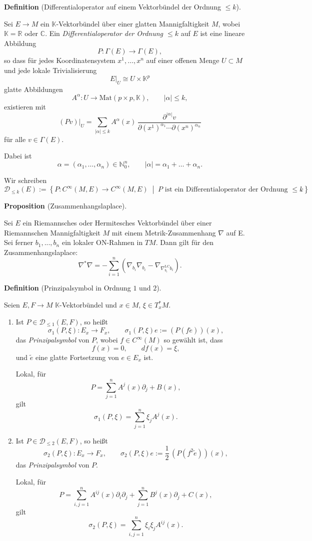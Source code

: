 \documentclass[10pt, letterpaper]{article}
\newcommand{\R}{\mathbb{R}}
\newcommand{\C}{\mathbb{C}}
\newcommand{\Mat}{\mathrm{Mat}}
\newcommand{\CustomHeading}[3]{%
  \par\medskip\noindent%
  \textbf{#1 #2} \textnormal{(#3)}.\enskip%
}
\newenvironment{DEF}[2]{\CustomHeading{Definition}{#1}{#2}}{}
\newenvironment{PROP}[2]{\CustomHeading{Proposition}{#1}{#2}}{}
\begin{document}
\begin{DEF}{}{Differentialoperator auf einem Vektorbündel der Ordnung $\le k$}
Sei $E \to M$ ein $\mathbb{K}$-Vektorbündel über einer glatten Mannigfaltigkeit $M$,
wobei $\mathbb{K}=\R$ oder $\C$.
Ein \emph{Differentialoperator der Ordnung $\le k$} auf $E$ ist eine lineare Abbildung
\[
P:\Gamma(E)\to \Gamma(E),
\]
so dass für jedes Koordinatensystem $x^1,\dots,x^n$ auf einer offenen Menge
$U\subset M$ und jede lokale Trivialisierung
\[
E|_U \cong U\times \mathbb{K}^p
\]
glatte Abbildungen
\[
A^\alpha:U\to \Mat(p\times p,\mathbb{K}),
\qquad |\alpha|\le k,
\]
existieren mit
\[
(Pv)|_U
=
\sum_{|\alpha|\le k}
A^\alpha(x)\,
\frac{\partial^{|\alpha|}v}{\partial (x^1)^{\alpha_1}\cdots \partial (x^n)^{\alpha_n}}
\]
für alle $v\in \Gamma(E)$.

Dabei ist
\[
\alpha=(\alpha_1,\dots,\alpha_n)\in \mathbb N_0^n,
\qquad
|\alpha|=\alpha_1+\dots+\alpha_n.
\]

Wir schreiben
\[
\mathscr D_{\le k}(E)
:=
\left\{
P:C^\infty(M,E)\to C^\infty(M,E)
\;\middle|\;
P \text{ ist ein Differentialoperator der Ordnung }\le k
\right\}.
\]
\end{DEF}


\begin{PROP}{\parencite[p.~110]{BaerSpin}}{Zusammenhangslaplace}
  Sei $E$ ein Riemannsches oder Hermitesches Vektorbündel über einer Riemannschen Mannigfaltigkeit $M$ mit einem Metrik-Zusammenhang $\nabla$ auf E. Sei ferner $b_1,...,b_n$ ein lokaler ON-Rahmen in $TM$. Dann gilt für den Zusammenhangslaplace:
    $$
    \nabla^* \nabla=-\sum_{i=1}^n\left(\nabla_{b_i} \nabla_{b_i}-\nabla_{\nabla_{b_i}^{\mathrm{LC}}b_i}\right) .
    $$
\end{PROP}

\begin{DEF}{}{Prinzipalsymbol in Ordnung \(1\) und \(2\)}
Seien \(E,F\to M\) \(\mathbb{K}\)-Vektorbündel und \(x\in M\), \(\xi\in T_x^*M\).

\begin{enumerate}
    \item Ist \(P\in \mathscr D_{\le 1}(E,F)\), so heißt
    \[
    \sigma_1(P,\xi):E_x\to F_x,
    \qquad
    \sigma_1(P,\xi)e:=(P(f\widetilde e))(x),
    \]
    das \emph{Prinzipalsymbol} von \(P\), wobei \(f\in C^\infty(M)\) so gewählt ist, dass
    \[
    f(x)=0,\qquad df(x)=\xi,
    \]
    und \(\widetilde e\) eine glatte Fortsetzung von \(e\in E_x\) ist.

    Lokal, für
    \[
    P=\sum_{j=1}^n A^j(x)\partial_j + B(x),
    \]
    gilt
    \[
    \sigma_1(P,\xi)=\sum_{j=1}^n \xi_j A^j(x).
    \]

    \item Ist \(P\in \mathscr D_{\le 2}(E,F)\), so heißt
    \[
    \sigma_2(P,\xi):E_x\to F_x,
    \qquad
    \sigma_2(P,\xi)e:=\frac12\,(P(f^2\widetilde e))(x),
    \]
    das \emph{Prinzipalsymbol} von \(P\).

    Lokal, für
    \[
    P=\sum_{i,j=1}^n A^{ij}(x)\partial_i\partial_j + \sum_{j=1}^n B^j(x)\partial_j + C(x),
    \]
    gilt
    \[
    \sigma_2(P,\xi)=\sum_{i,j=1}^n \xi_i\xi_j A^{ij}(x).
    \]
\end{enumerate}
\end{DEF}
\end{document}
